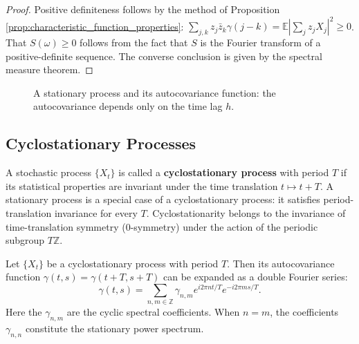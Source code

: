 \begin{proof}
Positive definiteness follows by the method of Proposition \ref{prop:characteristic_function_properties}: $\sum_{j,k} z_j \bar z_k \gamma(j-k) = \mathbb{E}|\sum_j z_j X_j|^2 \ge 0$. That $S(\omega) \ge 0$ follows from the fact that $S$ is the Fourier transform of a positive-definite sequence. The converse conclusion is given by the spectral measure theorem.
\end{proof}

\begin{figure}[htbp]
\centering
{}
\caption{A stationary process and its autocovariance function: the autocovariance depends only on the time lag $h$.}
\label{fig:stationary_process}
\end{figure}

\subsection{Cyclostationary Processes}

\begin{definition}\label{ch14_cyclostationary}
A stochastic process $\{X_t\}$ is called a \textbf{cyclostationary process} with period $T$ if its statistical properties are invariant under the time translation $t \mapsto t + T$. A stationary process is a special case of a cyclostationary process: it satisfies period-translation invariance for every $T$. Cyclostationarity belongs to the invariance of time-translation symmetry ($0$-symmetry) under the action of the periodic subgroup $T\mathbb{Z}$.
\end{definition}

\begin{proposition}\label{prop:cyclostationary_fourier}
Let $\{X_t\}$ be a cyclostationary process with period $T$. Then its autocovariance function $\gamma(t, s) = \gamma(t+T, s+T)$ can be expanded as a double Fourier series:
\[
\gamma(t, s) = \sum_{n, m \in \mathbb{Z}} \gamma_{n,m} e^{i 2\pi n t/T} e^{-i 2\pi m s/T}.
\]
Here the $\gamma_{n,m}$ are the cyclic spectral coefficients. When $n = m$, the coefficients $\gamma_{n,n}$ constitute the stationary power spectrum.
\end{proposition}

